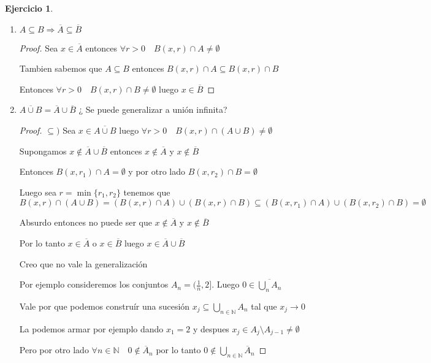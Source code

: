 \documentclass[11pt]{report}
\newcommand{\N}{\mathbb{N}}
\newcommand{\Ra}{\Rightarrow}
\newcommand{\ra}{\rightarrow}
\newcommand{\ol}{\overline}
\theoremstyle{definition}
\newtheorem{ej}{Ejercicio}
\begin{document}
\begin{ej}
\begin{enumerate}
\begin{enumerate}
\begin{proof}
	Ahora $\emptyset \neq \bigcap_{n \in \N} B(x,\frac{1}{n}) \cap X = (\bigcap_{n \in \N} B(x,\frac{1}{n})) \cap X = \{x\} \cap X$

	Entonces $\{x\} \cap X \neq \emptyset$ por lo tanto $x \in X$

	  \end{proof}
	\item $A \subseteq B \Ra \ol A \subseteq \ol B$
	  \begin{proof}
	    Sea $x \in \ol A$ entonces $\forall r>0 \quad B(x,r) \cap A \neq \emptyset$

	    Tambien sabemos que $A \subseteq B$ entonces $B(x,r) \cap A \subseteq B(x,r) \cap B$

	    Entonces $\forall r>0 \quad B(x,r) \cap B \neq \emptyset$ luego $x \in \ol B$
	  \end{proof}
	\item $\ol{A \cup B} = \ol A \cup \ol B$ ¿ Se puede generalizar a unión infinita?
	  \begin{proof}
	$\subseteq ) $ Sea $x \in \ol{A \cup B}$ luego $\forall r>0 \quad B(x,r) \cap (A \cup B) \neq \emptyset$

	Supongamos $x \notin \ol A \cup \ol B$ entonces $x \notin \ol A$ y $x \notin \ol B$

	Entonces $B(x,r_{1}) \cap A = \emptyset$ y por otro lado $B(x,r_{2}) \cap B = \emptyset$

	Luego sea $r = \min{\{r_{1},r_{2}\}}$ tenemos que 
      $$B(x,r) \cap (A \cup B) =(B(x,r) \cap A) \cup (B(x,r) \cap B) \subseteq (B(x,r_{1}) \cap A ) \cup (B(x,r_{2}) \cap B) = \emptyset $$

      Absurdo entonces no puede ser que $x \notin \ol A$ y $x \notin \ol B$

      Por lo tanto $x \in \ol A$ o $x \in \ol B$ luego $x \in \ol A \cup \ol B$

      Creo que no vale la generalización 

      Por ejemplo consideremos los conjuntos $A_n = (\frac{1}{n}, 2]$. Luego $0 \in \ol{\bigcup_{n} A_n}$

      Vale por que podemos construír una sucesión $x_j \subseteq \bigcup_{n \in \N} A_n$ tal que $x_j \ra 0$

      La podemos armar por ejemplo dando $x_1 = 2 $ y despues $x_j \in A_j \setminus A_{j-1} \neq \emptyset$

      Pero por otro lado $\forall n \in \N \quad 0 \notin \ol A_n$ por lo tanto $0 \notin \bigcup_{n\in \N} \ol A_n$


\end{proof}
\end{enumerate}
\end{enumerate}
\end{ej}
\end{document}
